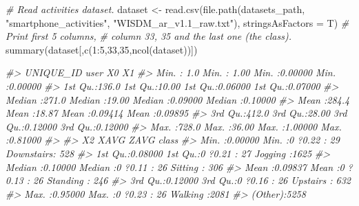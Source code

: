 \documentclass[
  11pt,
]{krantz}
\newenvironment{Shaded}{\begin{snugshade}}{\end{snugshade}}
\newcommand{\AttributeTok}[1]{\textcolor[rgb]{0.61,0.61,0.61}{#1}}
\newcommand{\CommentTok}[1]{\textcolor[rgb]{0.37,0.37,0.37}{\textit{#1}}}
\newcommand{\DecValTok}[1]{\textcolor[rgb]{0.06,0.06,0.06}{#1}}
\newcommand{\FunctionTok}[1]{\textcolor[rgb]{0,0,0}{#1}}
\newcommand{\NormalTok}[1]{#1}
\newcommand{\OtherTok}[1]{\textcolor[rgb]{0.37,0.37,0.37}{#1}}
\newcommand{\SpecialCharTok}[1]{\textcolor[rgb]{0,0,0}{#1}}
\newcommand{\StringTok}[1]{\textcolor[rgb]{0.5,0.5,0.5}{#1}}
\begin{document}
\begin{Shaded}
\begin{Highlighting}[]
\CommentTok{\# Read activities dataset.}
\NormalTok{dataset }\OtherTok{\textless{}{-}} \FunctionTok{read.csv}\NormalTok{(}\FunctionTok{file.path}\NormalTok{(datasets\_path,}
                              \StringTok{"smartphone\_activities"}\NormalTok{,}
                              \StringTok{"WISDM\_ar\_v1.1\_raw.txt"}\NormalTok{),}
                              \AttributeTok{stringsAsFactors =}\NormalTok{ T)}
\CommentTok{\# Print first 5 columns,}
\CommentTok{\# column 33, 35 and the last one (the class).}
\FunctionTok{summary}\NormalTok{(dataset[,}\FunctionTok{c}\NormalTok{(}\DecValTok{1}\SpecialCharTok{:}\DecValTok{5}\NormalTok{,}\DecValTok{33}\NormalTok{,}\DecValTok{35}\NormalTok{,}\FunctionTok{ncol}\NormalTok{(dataset))])}

\CommentTok{\#\textgreater{} UNIQUE\_ID          user             X0                X1         }
\CommentTok{\#\textgreater{} Min.   :  1.0   Min.   : 1.00   Min.   :0.00000   Min.   :0.00000  }
\CommentTok{\#\textgreater{} 1st Qu.:136.0   1st Qu.:10.00   1st Qu.:0.06000   1st Qu.:0.07000  }
\CommentTok{\#\textgreater{} Median :271.0   Median :19.00   Median :0.09000   Median :0.10000  }
\CommentTok{\#\textgreater{} Mean   :284.4   Mean   :18.87   Mean   :0.09414   Mean   :0.09895  }
\CommentTok{\#\textgreater{} 3rd Qu.:412.0   3rd Qu.:28.00   3rd Qu.:0.12000   3rd Qu.:0.12000  }
\CommentTok{\#\textgreater{} Max.   :728.0   Max.   :36.00   Max.   :1.00000   Max.   :0.81000  }
\CommentTok{\#\textgreater{} }
\CommentTok{\#\textgreater{} X2               XAVG        ZAVG             class     }
\CommentTok{\#\textgreater{} Min.   :0.00000   Min.   :0   ?0.22  :  29   Downstairs: 528  }
\CommentTok{\#\textgreater{} 1st Qu.:0.08000   1st Qu.:0   ?0.21  :  27   Jogging   :1625  }
\CommentTok{\#\textgreater{} Median :0.10000   Median :0   ?0.11  :  26   Sitting   : 306  }
\CommentTok{\#\textgreater{} Mean   :0.09837   Mean   :0   ?0.13  :  26   Standing  : 246  }
\CommentTok{\#\textgreater{} 3rd Qu.:0.12000   3rd Qu.:0   ?0.16  :  26   Upstairs  : 632  }
\CommentTok{\#\textgreater{} Max.   :0.95000   Max.   :0   ?0.23  :  26   Walking   :2081  }
\CommentTok{\#\textgreater{} (Other):5258}
\end{Highlighting}
\end{Shaded}
\end{document}
